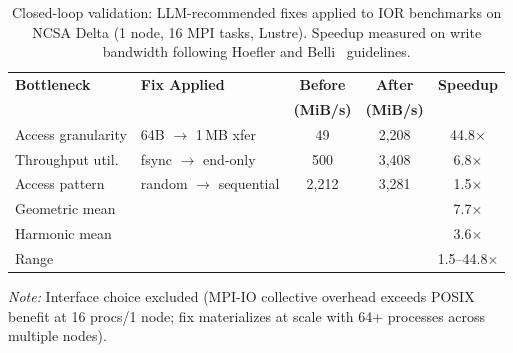 \begin{table}[t]
\centering
\caption{Closed-loop validation: LLM-recommended fixes applied to IOR
benchmarks on NCSA Delta (1 node, 16 MPI tasks, Lustre). Speedup measured
on write bandwidth following Hoefler and Belli~\cite{hoefler2015} guidelines.}
\label{tab:closed_loop}
\small
\begin{tabular}{llccc}
\toprule
\textbf{Bottleneck} & \textbf{Fix Applied} & \textbf{Before} & \textbf{After} & \textbf{Speedup} \\
 & & \textbf{(MiB/s)} & \textbf{(MiB/s)} & \\
\midrule
Access granularity     & 64B $\rightarrow$ 1\,MB xfer      &    49 & 2,208 & 44.8$\times$ \\
Throughput util.       & fsync $\rightarrow$ end-only       &   500 & 3,408 &  6.8$\times$ \\
Access pattern         & random $\rightarrow$ sequential    & 2,212 & 3,281 &  1.5$\times$ \\
\midrule
Geometric mean         &                                    &       &       &  7.7$\times$ \\
Harmonic mean          &                                    &       &       &  3.6$\times$ \\
Range                  &                                    &       &       & 1.5--44.8$\times$ \\
\bottomrule
\end{tabular}
\vspace{1mm}
\raggedright
\footnotesize
\textit{Note:} Interface choice excluded (MPI-IO collective overhead exceeds
POSIX benefit at 16 procs/1 node; fix materializes at scale with 64+
processes across multiple nodes).
\end{table}
